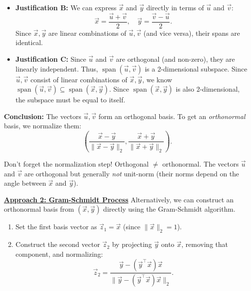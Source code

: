 \documentclass[10pt]{article}
\theoremstyle{definition}
\theoremstyle{plain}
\DeclareMathOperator{\spn}{span}
\begin{document}
\begin{enumerate}[label=(\alph*)]
\begin{itemize}
        \item \textbf{Justification B:} We can express $\vec{x}$ and $\vec{y}$ directly in terms of $\vec{u}$ and $\vec{v}$:
        \begin{equation}
            \vec{x} = \frac{\vec{u} + \vec{v}}{2}, \quad \vec{y} = \frac{\vec{v} - \vec{u}}{2}.
        \end{equation}
        Since $\vec{x}, \vec{y}$ are linear combinations of $\vec{u}, \vec{v}$ (and vice versa), their spans are identical.

        \item \textbf{Justification C:} Since $\vec{u}$ and $\vec{v}$ are orthogonal (and non-zero), they are linearly independent. Thus, $\spn(\vec{u}, \vec{v})$ is a 2-dimensional subspace. Since $\vec{u}, \vec{v}$ consist of linear combinations of $\vec{x}, \vec{y}$, we know $\spn(\vec{u}, \vec{v}) \subseteq \spn(\vec{x}, \vec{y})$. Since $\spn(\vec{x}, \vec{y})$ is also 2-dimensional, the subspace must be equal to itself.
    \end{itemize}

    \textbf{Conclusion:} The vectors $\vec{u}, \vec{v}$ form an orthogonal basis. To get an \textit{orthonormal} basis, we normalize them:
    \begin{equation}
        \left( \frac{\vec{x} - \vec{y}}{\|\vec{x} - \vec{y}\|_2}, \frac{\vec{x} + \vec{y}}{\|\vec{x} + \vec{y}\|_2} \right).
    \end{equation}

    \begin{pitfall}
    Don't forget the normalization step! Orthogonal $\neq$ orthonormal. The vectors $\vec{u}$ and $\vec{v}$ are orthogonal but generally \emph{not} unit-norm (their norms depend on the angle between $\vec{x}$ and $\vec{y}$).
    \end{pitfall}

    \textbf{\underline{Approach 2: Gram-Schmidt Process}} \quad Alternatively, we can construct an orthonormal basis from $(\vec{x}, \vec{y})$ directly using the Gram-Schmidt algorithm.

    \begin{enumerate}[label=\roman*.]
        \item Set the first basis vector as $\vec{z}_1 = \vec{x}$ (since $\|\vec{x}\|_2 = 1$).
        \item Construct the second vector $\vec{z}_2$ by projecting $\vec{y}$ onto $\vec{x}$, removing that component, and normalizing:
        \begin{equation}
            \vec{z}_2 = \frac{\vec{y} - (\vec{y}^\top \vec{x})\vec{x}}{\|\vec{y} - (\vec{y}^\top \vec{x})\vec{x}\|_2}.
        \end{equation}
    \end{enumerate}


\end{enumerate}
\end{document}
